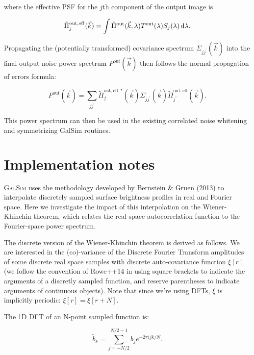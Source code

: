 \documentclass{article}
\begin{document}
where the effective PSF for the $j$th component of the output image is

\begin{equation}
  \tilde{\Pi}_j^\mathrm{out, eff}(\vec{k}) = \int \tilde{\Pi}^\mathrm{out}(\vec{k}, \lambda) T^\mathrm{out}(\lambda) S_j(\lambda)\dif{\lambda}.
\end{equation}

Propagating the (potentially transformed) covariance spectrum $\Sigma_{jj^\prime}(\vec{k})$ into the
final output noise power spectrum $P^\mathrm{out}(\vec{k})$ then follows the normal propagation of
errors formula:

\begin{equation}
  P^\mathrm{out}(\vec{k}) = \sum_{jj^\prime} \tilde{\Pi}_j^\mathrm{out, eff, *}(\vec{k}) \Sigma_{jj^\prime}(\vec{k}) \tilde{\Pi}_{j^\prime}^\mathrm{out, eff}(\vec{k}).
\end{equation}

This power spectrum can then be used in the existing correlated noise whitening and symmetrizing
GalSim routines.

\section{Implementation notes}

\textsc{GalSim} uses the methodology developed by Bernstein \& Gruen (2013) to interpolate
discretely sampled surface brightness profiles in real and Fourier space.  Here we investigate the
impact of this interpolation on the Wiener-Khinchin theorem, which relates the real-space
autocorrelation function to the Fourier-space power spectrum.

The discrete version of the Wiener-Khinchin theorem is derived as follows.  We are interested in
the (co)-variance of the Discrete Fourier Transform amplitudes of some discrete real space samples
with discrete auto-covariance function $\xi\left[r\right]$ (we follow the convention of
Rowe++14 in using square brackets to indicate the arguments of a discretly sampled function, and
reserve parentheses to indicate arguments of continuous objects).  Note that since we're using DFTs,
$\xi$ is implicitly periodic: $\xi\left[r\right] = \xi\left[r+N\right]$.

The 1D DFT of an N-point sampled function is:

\begin{equation}
    \tilde{b}_k = \sum_{j=-N/2}^{N/2-1} b_j e^{-2 \pi i j k / N}.
\end{equation}
\end{document}
